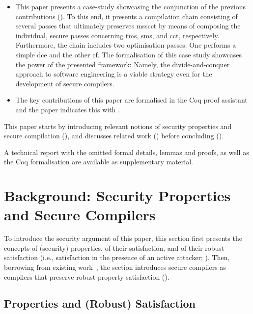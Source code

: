 \documentclass[utf8,acmsmall,review,screen,dvipsnames,anonymous]{acmart}
\begin{document}
\begin{itemize}
  \item %
        This paper presents a case-study showcasing the conjunction of the previous contributions ().
        To this end, it presents a compilation chain consisting of several passes that ultimately preserves \gls*{msscct} by means of composing the individual, secure passes concerning \gls*{tms}, \gls*{sms}, and \gls*{cct}, respectively.
        Furthermore, the chain includes two optimisation passes: One performs a simple \gls*{dce} and the other \gls*{cf}.
        The formalisation of this case study showcases the power of the presented framework: Namely, the divide-and-conquer approach to software engineering is a viable strategy even for the development of secure compilers.

  \item The key contributions of this paper are formalised in the Coq proof assistant and the paper indicates this with \CoqSymbol.
\end{itemize}

This paper starts by introducing relevant notions of security properties and secure compilation (),
and discusses related work () before concluding ().

 A technical report with the omitted formal details, lemmas and proofs, as well as the Coq formalisation are available as supplementary material.


\section{Background: Security Properties and Secure Compilers}\label{sec:background}

To introduce the security argument of this paper, this section first presents the concepts of (security) properties, of their satisfaction, and of their robust satisfaction (i.e., satisfaction in the presence of an active attacker; ).
Then, borrowing from existing work~\cite{abate2019jour,abate2021extacc}, the section introduces secure compilers as compilers that preserve robust property satisfaction ().

\subsection{Properties and (Robust) Satisfaction}\label{subsec:bg:tprop}
\end{document}
